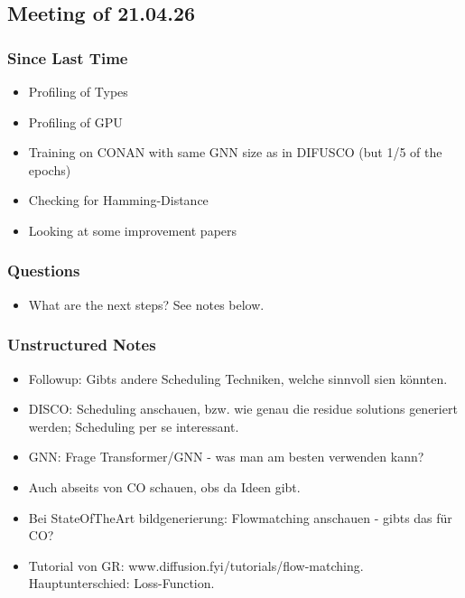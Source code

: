 
\subsection{Meeting of 21.04.26}
\subsubsection{Since Last Time}
\begin{itemize}
    \item Profiling of Types
    \item Profiling of GPU
    \item Training on CONAN with same GNN size as in DIFUSCO (but 1/5 of the epochs)
    \item Checking for Hamming-Distance
    \item Looking at some improvement papers
\end{itemize}
\subsubsection{Questions}
\begin{itemize}
    \item What are the next steps? See notes below.
\end{itemize}
\subsubsection{Unstructured Notes}
\begin{itemize}
    \item Followup: Gibts andere Scheduling Techniken, welche sinnvoll sien könnten.
    \item DISCO: Scheduling anschauen, bzw. wie genau die residue solutions generiert werden; Scheduling per se interessant.
    \item GNN: Frage Transformer/GNN - was man am besten verwenden kann?
    \item Auch abseits von CO schauen, obs da Ideen gibt.
    \item Bei StateOfTheArt bildgenerierung: Flowmatching anschauen - gibts das für CO?
    \item Tutorial von GR: www.diffusion.fyi/tutorials/flow-matching. Hauptunterschied: Loss-Function.
\end{itemize}